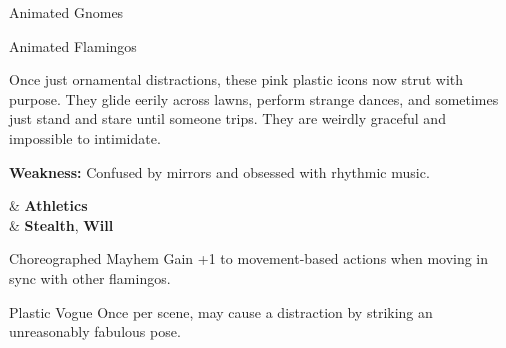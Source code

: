 \begin{multicols}{2}
\begin{NPC}[description={Grumpy, Stabby, Collectible}]{Animated Gnomes}
    \DamageBox[%
        totalfatigue=1,%
        totalmild=1,totalmoderate=0,totalsevere=0,%
    ]
\end{NPC}

\begin{NPC}[description={Elegant, Flightless, Unnervingly Stylish}]{Animated Flamingos}

    Once just ornamental distractions, these pink plastic icons now strut with purpose. They glide eerily across lawns, perform strange dances, and sometimes just stand and stare until someone trips. They are weirdly graceful and impossible to intimidate.

    \textbf{Weakness:} Confused by mirrors and obsessed with rhythmic music.

    \vspace{0.5\baselineskip}
    \begin{SkillsBox}
        \Skilled & \textbf{Athletics} \\
        \Novice  & \textbf{Stealth}, \textbf{Will}
    \end{SkillsBox}

    \begin{TraitsBox}
        \item[Choreographed Mayhem] Gain +1 to movement-based actions when moving in sync with other flamingos.
        \item[Plastic Vogue] Once per scene, may cause a distraction by striking an unreasonably fabulous pose.
    \end{TraitsBox}

    \DamageBox[%
        totalfatigue=1,%
        totalmild=0,totalmoderate=0,totalsevere=0,%
    ]
\end{NPC}


\end{multicols}
\clearpage
